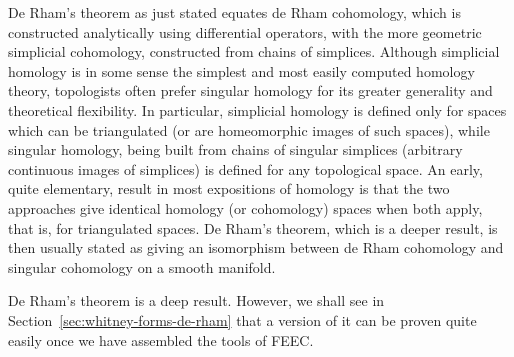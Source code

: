 \begin{Remark}\label{rem:singular-simplicial-de-rham}
{De Rham's theorem as just stated equates de Rham cohomology, which is constructed analytically using differential operators, with the more geometric simplicial cohomology, constructed from chains of simplices. Although simplicial homology is in some sense the simplest and most easily computed homology theory, topologists often prefer singular homology for its greater generality and theoretical flexibility. In particular, simplicial homology is defined only for spaces which can be triangulated (or are homeomorphic images of such spaces), while singular homology, being built from chains of singular simplices (arbitrary continuous images of simplices) is defined for any topological space. An early, quite elementary, result in most expositions of homology is that the two approaches give identical homology (or cohomology) spaces when both apply, that is, for triangulated spaces. De Rham's theorem, which is a deeper result, is then usually stated as giving an isomorphism between de Rham cohomology and singular cohomology on a smooth manifold.}
\end{Remark}

{De Rham's theorem is a deep result. However, we shall see in Section~\ref{sec:whitney-forms-de-rham} that a version of it can be proven quite easily once we have assembled the tools of FEEC.}
